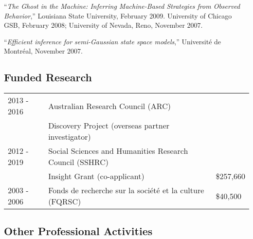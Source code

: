 \documentclass[12pt]{article}
\begin{document}
``{\it The Ghost in the Machine: Inferring Machine-Based Strategies from Observed Behavior},'' 
Louisiana State University, February 2009.
University of Chicago GSB, February 2008;
University of Nevada, Reno, November 2007.

``{\it Efficient inference for semi-Gaussian state space models},''
Universit\'e de Montr\'eal, November 2007.







\subsection*{Funded Research}

\begin{tabular}{lll}
2013 - 2016
& Australian Research Council (ARC) \\
& Discovery Project (overseas partner investigator) \\
2012 - 2019
& Social Sciences and Humanities Research Council (SSHRC) \\
& Insight Grant (co-applicant)
& \$257,660 \\
2003 - 2006
& Fonds de recherche sur la soci\'et\'e et la culture (FQRSC)
& \$40,500 \\
\end{tabular}

\subsection*{Other Professional Activities}
\end{document}
